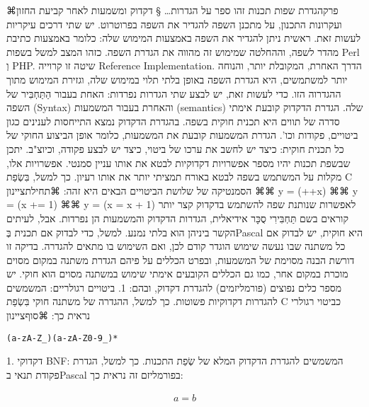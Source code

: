       ⌘פרק{הגדרת שפות תכנות}
      זהו ספר על הגדרות…
      § דקדוק ומשמעות
      לאחר קביעת החזון ועקרונות התכנון, על מתכנן השפה להגדיר את השפה בפרוטרוט. יש שתי דרכים עיקריות לעשות זאת. ראשית ניתן להגדיר את השפה באמצעות המימוש שלה: כלומר באמצעות כתיבת מהדר לשפה, וההחלטה שמימוש זה מהווה את הגדרת השפה. כזהו המצב למשל בשפות Perl וְ PHP. שיטה זו קרוייה Reference Implementation.
      הדרך האחרת, המקובלת יותר, והנוחה יותר למשתמשים, היא הגדרת השפה באופן בלתי תלוי במימוש שלה, וגזירת המימוש מתוך ההגדרוה הזו. כדי לעשות זאת, יש לבצע שתי הגדרות נפרדות: האחת בעבור הַתַּחְבִּיר של השפה (Syntax) והאחרת בעבור המשמעות (semantics) שלה.
      הגדרת הדקדוק קובעת אימתי סדרה של תווים היא תכנית חוקית בשפה. בהגדרת הדקדוק נמצא התייחסות לענינים כגון ביטויים, פקודות וכו'. הגדרת המשמעות קובעת את המשמעות, כלומר אופן הביצוע החוקי של כל תכנית חוקית: כיצד יש לחשב את ערכו של ביטוי, כיצד יש לבצע פקודה, וכיוצ"ב.
      יתכן שבשפת תכנות יהיו מספר אפשרויות דקדוקיות לבטא את אותו עניין סמנטי. אפשרויות אלו, מקלות על המשתמש בשפה לבטא באורח תמציתי יותר את אותו רעיון. כך למשל, בִּשְׂפַת C הסמנטיקה של שלושת הביטויים הבאים היא זהה:
      ⌘תחילת{ציינון}
      ⌘⌘ y = (++x)
      ⌘⌘ y = (x += 1)
      ⌘⌘ y = (x = x + 1)
      לאפשרות שנותנת שפה להשתמש בדקדוק קצר יותר קוראים בשם תַּחְבִּירִי סֻכָּר
      אידיאלית, הגדרות הדקדוק והמשמעות הן נפרדות. אבל, לעיתים הקשר ביניהן הוא בלתי נמנע. למשל, כדי לבדוק אם תכנית בְּPascal היא חוקית, יש לבדוק אם כל משתנה שבו נעשה שימוש הוגדר קודם לכן, ואם השימוש בו מתאים להגדרה. בדיקה זו דורשת הבנה מסוימת של המשמעות, ובפרט הכללים על פיהם הגדרת משתנה במקום מסוים מוכרת במקום אחר, כמו גם הכללים הקובעים אימתי שימוש במשתנה מסוים הוא חוקי.
      יש מספר כלים נפוצים (פורמליזמים) להגדרת דקדוק, ובהם:
      1. ביטויים רגולריים: המשמשים להגדרות דקדוקיות פשוטות. כך למשל, ההגדרה של משתנה חוקי בִּשְׂפַת C כביטוי רגולרי נראית כך:
  ⌘סוף{ציינון}

\begin{verbatim}
(a-zA-Z_)(a-zA-Z0-9_)*
\end{verbatim}
      1. דקדוקי BNF: המשמשים להגדרת הדקדוק המלא של שְׂפַת התכנות. כך למשל, הגדרת פקודת תנאי בPascal בפורמליזם זה נראית כך:

      \begin{align}
        a=b
      \end{align}


